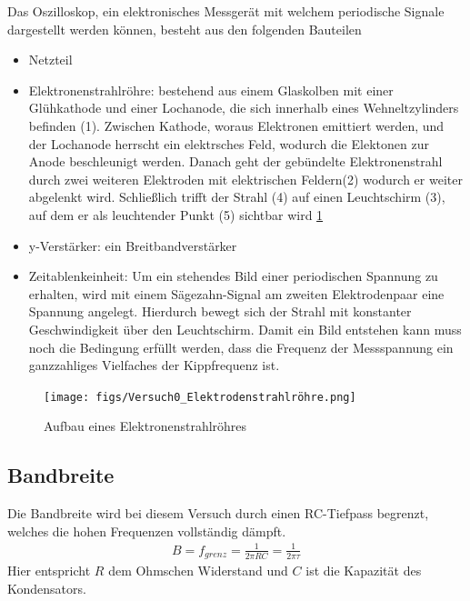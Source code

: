 \documentclass{article}
\begin{document}
Das Oszilloskop, ein elektronisches Messgerät mit welchem periodische Signale dargestellt werden können, besteht aus den folgenden Bauteilen
\begin{itemize}
    \item Netzteil
    \item Elektronenstrahlröhre: bestehend aus einem Glaskolben mit einer Glühkathode und einer Lochanode,
     die sich innerhalb eines Wehneltzylinders befinden (1). Zwischen Kathode, woraus Elektronen emittiert
      werden, und der Lochanode herrscht ein elektrsches Feld, wodurch die Elektonen zur Anode beschleunigt 
      werden. Danach geht der gebündelte Elektronenstrahl durch zwei weiteren Elektroden mit elektrischen 
      Feldern(2) wodurch er weiter abgelenkt wird. Schließlich trifft der Strahl (4) auf einen Leuchtschirm
       (3), auf dem er als leuchtender Punkt (5) sichtbar wird \ref{fig:elektronenstrahlröhre} \\
    
    \item y-Verstärker: ein Breitbandverstärker
    
    \item Zeitablenkeinheit: Um ein stehendes Bild einer periodischen Spannung zu erhalten, wird mit einem Sägezahn-Signal am zweiten Elektrodenpaar eine Spannung angelegt. Hierdurch bewegt sich der Strahl mit konstanter Geschwindigkeit über den Leuchtschirm. Damit ein Bild entstehen kann muss noch die Bedingung erfüllt werden, dass die Frequenz der Messspannung ein ganzzahliges Vielfaches der Kippfrequenz ist.

    
\end{itemize}
\begin{figure}[H]
    \centering
    \texttt{[image: figs/Versuch0\_Elektrodenstrahlröhre.png]}
    \caption{Aufbau eines Elektronenstrahlröhres \cite{anleitung}}
    \label{fig:elektronenstrahlröhre}
\end{figure}

\subsection{Bandbreite}
Die Bandbreite wird bei diesem Versuch durch einen RC-Tiefpass begrenzt, welches die hohen Frequenzen vollständig dämpft.
\begin{align}
  B = f_{grenz}= \frac{1}{2\pi RC}=  \frac{1}{2\pi \tau}
\end{align}
Hier entspricht $R$ dem Ohmschen Widerstand und $C$ ist die Kapazität des Kondensators. 
\end{document}
